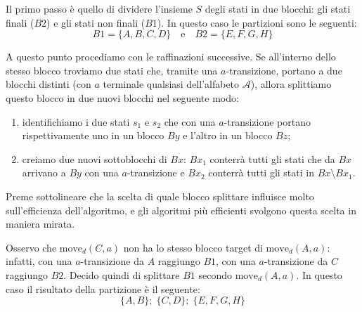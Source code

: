\documentclass[class=book, crop=false, oneside, 12pt]{standalone}
\begin{document}
Il primo passo è quello di dividere l'insieme \(S\) degli stati in due blocchi: gli stati finali (\(B2\)) e gli stati non finali (\(B1\)).
In questo caso le partizioni sono le seguenti:
\begin{equation*}
    B1 = \{A,B,C,D\} \quad \textrm{e} \quad B2 = \{E,F,G,H\}
\end{equation*}

A questo punto procediamo con le raffinazioni successive. Se all’interno dello stesso blocco troviamo due stati che, tramite una \(a\)-transizione, portano a due blocchi distinti (con \(a\) terminale qualsiasi dell’alfabeto \(\mathcal{A}\)), allora splittiamo questo blocco in due nuovi blocchi nel seguente modo:
\begin{enumerate}
    \item identifichiamo i due stati \(s_1\) e \(s_2\) che con una \(a\)-transizione portano rispettivamente uno in un blocco \(By\) e l’altro in un blocco \(Bz\);
    \item creiamo due nuovi sottoblocchi di \(Bx\): \(Bx_{1}\) conterrà tutti gli stati che da \(Bx\) arrivano a \(By\) con una \(a\)-transizione e \(Bx_{2}\) conterrà tutti gli stati in \(Bx \setminus Bx_{1}\).
\end{enumerate} 
Preme sottolineare che la scelta di quale blocco splittare influisce molto sull’efficienza dell’algoritmo, e gli algoritmi più efficienti svolgono questa scelta in maniera mirata.

Osservo che \(\textrm{move}_d (C,a)\) non ha lo stesso blocco target di \(\textrm{move}_d (A,a) \): infatti, con una \(a\)-transizione da \(A\) raggiungo \(B1\), con una \(a\)-transizione da \(C\) raggiungo \(B2\). Decido quindi di splittare \(B1\) secondo \(\textrm{move}_d (A,a) \). In questo caso il risultato della partizione è il seguente:
\begin{equation*}
    \{A, B\};\; \{C, D\};\; \{E,F,G,H\}
\end{equation*}
\end{document}
